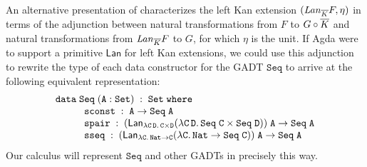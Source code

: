 \documentclass{lmcs}
\theoremstyle{plain}\newtheorem{satz}[thm]{Satz}
\begin{document}
An alternative presentation of characterizes the left Kan extension
$(\mathit{Lan}_{\overline{K}} F, \eta)$ in terms of the adjunction between
natural transformations from $F$ to $G \circ \overline{K}$ and natural
transformations from $\mathit{Lan}_{\overline{K}} F$ to $G$, for which
$\eta$ is the unit. If Agda were to support a primitive
$\mathsf{Lan}$ for left Kan extensions, we could use this adjunction
to rewrite the type of each data constructor for the GADT
$\mathtt{Seq}$ to arrive at the following equivalent representation:
{\small
\[\begin{array}{l}
\mathtt{data\; Seq \;(A : Set)\;:\;Set\;where}\\
\hspace*{0.4in}\mathtt{sconst\;:\; A \rightarrow Seq\;A}\\
\hspace*{0.4in}\mathtt{spair\;:\;(\mathsf{Lan}_{\lambda C\,D.\,C \times D}
  (\lambda C\,D.\,Seq\;C\times Seq\;D))\;A \rightarrow Seq\;A}\\ 
\hspace*{0.4in}\mathtt{sseq\;:\;(\mathsf{Lan}_{\lambda C.\,Nat \to C}
  (\lambda C.\,Nat \rightarrow Seq\;C))\;A \rightarrow
  Seq\;A}
\end{array}\]}
\noindent
\!\!Our calculus will represent $\mathtt{Seq}$ and other GADTs in
precisely this way.

\vspace*{0.05in}
\end{document}

